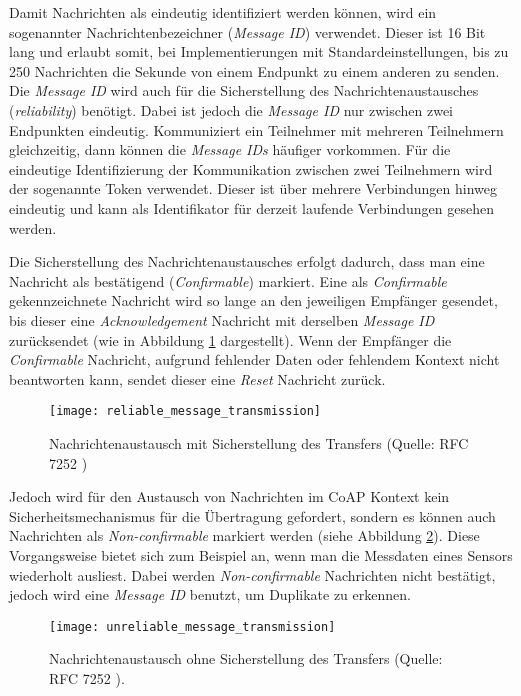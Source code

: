 Damit Nachrichten als eindeutig identifiziert werden können, wird ein sogenannter Nachrichtenbezeichner (\textit{Message ID}) verwendet. Dieser ist 16 Bit lang und erlaubt somit, bei Implementierungen mit Standardeinstellungen, bis zu 250 Nachrichten die Sekunde von einem Endpunkt zu einem anderen zu senden. Die \textit{Message ID} wird auch für die Sicherstellung des Nachrichtenaustausches (\textit{reliability}) benötigt. Dabei ist jedoch die \textit{Message ID} nur zwischen zwei Endpunkten eindeutig. Kommuniziert ein Teilnehmer mit mehreren Teilnehmern gleichzeitig, dann können die \textit{Message IDs} häufiger vorkommen. Für die eindeutige Identifizierung der Kommunikation zwischen zwei Teilnehmern wird der sogenannte Token verwendet. Dieser ist über mehrere Verbindungen hinweg eindeutig und kann als Identifikator für derzeit laufende Verbindungen gesehen werden.

Die Sicherstellung des Nachrichtenaustausches erfolgt dadurch, dass man eine Nachricht als bestätigend (\textit{Confirmable}) markiert. Eine als \textit{Confirmable} gekennzeichnete Nachricht wird so lange an den jeweiligen Empfänger gesendet, bis dieser eine \textit{Acknowledgement} Nachricht mit derselben \textit{Message ID} zurücksendet (wie in Abbildung \ref{fig:nachrichtenaustausch-mit-sicherstellung-des-transfers} dargestellt). Wenn der Empfänger die \textit{Confirmable} Nachricht, aufgrund fehlender Daten oder fehlendem Kontext nicht beantworten kann, sendet dieser eine \textit{Reset} Nachricht zurück.

\begin{figure}[h]
    \centering
    \texttt{[image: reliable\_message\_transmission]}
    \caption{Nachrichtenaustausch mit Sicherstellung des Transfers (Quelle: RFC 7252 \autocite{RFC7252})}
    \label{fig:nachrichtenaustausch-mit-sicherstellung-des-transfers}
\end{figure}

Jedoch wird für den Austausch von Nachrichten im CoAP Kontext kein Sicherheitsmechanismus für die Übertragung gefordert, sondern es können auch Nachrichten als \textit{Non-confirmable} markiert werden (siehe Abbildung \ref{fig:nachrichtenaustausch-ohne-sicherstellung-des-transfers}). Diese Vorgangsweise bietet sich zum Beispiel an, wenn man die Messdaten eines Sensors wiederholt ausliest. Dabei werden \textit{Non-confirmable} Nachrichten nicht bestätigt, jedoch wird eine \textit{Message ID} benutzt, um Duplikate zu erkennen.

\begin{figure}[h]
    \centering
    \texttt{[image: unreliable\_message\_transmission]}
    \caption{Nachrichtenaustausch ohne Sicherstellung des Transfers (Quelle: RFC 7252 \autocite{RFC7252}).}
    \label{fig:nachrichtenaustausch-ohne-sicherstellung-des-transfers}
\end{figure}

